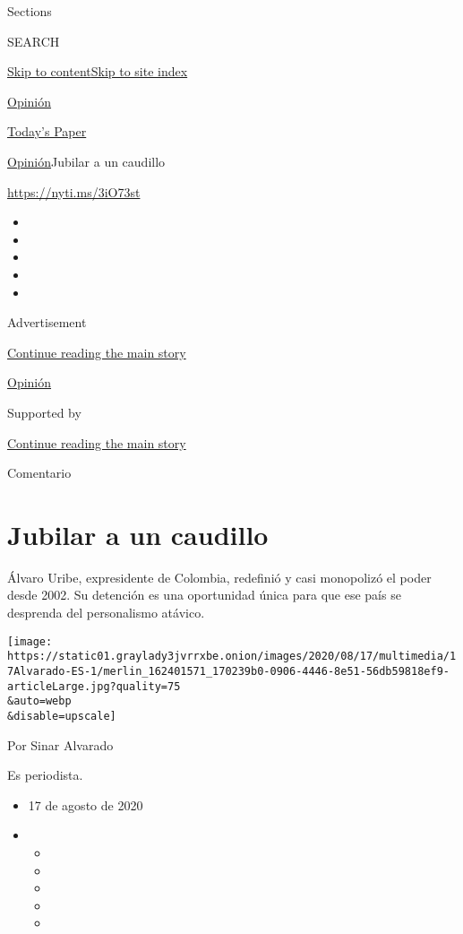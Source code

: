 Sections

SEARCH

\protect\hyperlink{site-content}{Skip to
content}\protect\hyperlink{site-index}{Skip to site index}

\href{https://www.nytimes3xbfgragh.onion/es/section/opinion}{Opinión}

\href{https://myaccount.nytimes3xbfgragh.onion/auth/login?response_type=cookie\&client_id=vi}{}

\href{https://www.nytimes3xbfgragh.onion/section/todayspaper}{Today's
Paper}

\href{/es/section/opinion}{Opinión}\textbar{}Jubilar a un caudillo

\url{https://nyti.ms/3iO73st}

\begin{itemize}
\item
\item
\item
\item
\item
\end{itemize}

Advertisement

\protect\hyperlink{after-top}{Continue reading the main story}

\href{/es/section/opinion}{Opinión}

Supported by

\protect\hyperlink{after-sponsor}{Continue reading the main story}

Comentario

\hypertarget{jubilar-a-un-caudillo}{%
\section{Jubilar a un caudillo}\label{jubilar-a-un-caudillo}}

Álvaro Uribe, expresidente de Colombia, redefinió y casi monopolizó el
poder desde 2002. Su detención es una oportunidad única para que ese
país se desprenda del personalismo atávico.

\texttt{[image: https://static01.graylady3jvrrxbe.onion/images/2020/08/17/multimedia/17Alvarado-ES-1/merlin\_162401571\_170239b0-0906-4446-8e51-56db59818ef9-articleLarge.jpg?quality=75\\\&auto=webp\\\&disable=upscale]}

Por Sinar Alvarado

Es periodista.

\begin{itemize}
\item
  17 de agosto de 2020
\item
  \begin{itemize}
  \item
  \item
  \item
  \item
  \item
  \end{itemize}
\end{itemize}

